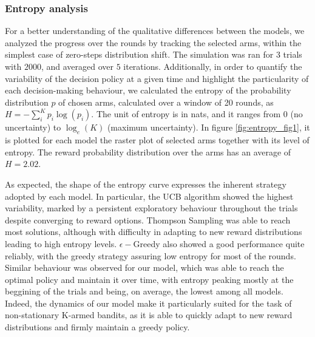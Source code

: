 \subsubsection{Entropy analysis}\label{sec:entropy}
\noindent For a better understanding of the qualitative differences between the models, we analyzed the progress over the rounds by tracking the selected arms, within the simplest case of zero-steps distribution shift.
The simulation was ran for $3$ trials with $2000$, and averaged over $5$ iterations.
Additionally, in order to quantify the variability of the decision policy at a given time and highlight the particularity of each decision-making behaviour, we calculated the entropy of the probability distribution $p$ of chosen arms, calculated over a window of 20 rounds, as $H=-\sum^{K}_{i} p_{i}\log(p_{i})$.
The unit of entropy is in nats, and it ranges from $0$ (no uncertainty) to $\log_{e}(K)$ (maximum uncertainty).
In figure \ref{fig:entropy_fig1}, it is plotted for each model the raster plot of selected arms together with its level of entropy. The reward probability distribution over the arms has an average of $H=2.02$.

As expected, the shape of the entropy curve expresses the inherent strategy adopted by each model.
In particular, the UCB algorithm showed the highest variability, marked by a persistent exploratory behaviour throughout the trials despite converging to reward options. Thompson Sampling was able to reach most solutions, although with difficulty in adapting to new reward distributions
leading to high entropy levels.
$\epsilon-$Greedy also showed a good performance quite reliably, with the greedy strategy assuring low entropy for most of the rounds.
Similar behaviour was observed for our model, which was able to reach the optimal policy and maintain it over time, with entropy peaking mostly at the beggining of the trials and being, on average, the lowest among all models.
Indeed, the dynamics of our model make it particularly suited for the task of non-stationary K-armed bandits, as it is able to quickly adapt to new reward distributions and firmly maintain a greedy policy.

